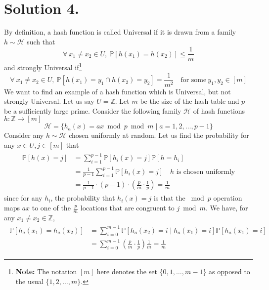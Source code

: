 \documentclass[9pt]{article}
\newcommand{\Probability}[1]{\mathbb{P}\left[ #1 \right]}
\begin{document}
\section*{\textbf{Solution 4.}}
By definition, a hash function is called Universal if it is drawn from a family $h \sim \mathcal{H}$
such that
\begin{equation}
    \forall \ x_{1} \neq x_{2} \in U, \ \Probability{h(x_{1}) = h(x_{2})} \leq \frac{1}{m}
\end{equation}
and strongly Universal if\footnote{
    \textbf{Note:} The notation $[m]$ here denotes the set $\{0, 1, \dots, m-1\}$
    as opposed to the usual $\{1, 2, \dots, m\}$.
}
\begin{equation}
    \forall \ x_{1} \neq x_{2} \in U, \ \Probability{h(x_{1}) = y_{1} \cap h(x_{2}) = y_{2}}
    = \frac{1}{m^{2}} \quad \text{for some} \ y_{1}, y_{2} \in [m]
\end{equation}
We want to find an example of a hash function which is Universal, but not strongly Universal.
Let us say $U = \mathbb{Z}$. Let $m$ be the size of the hash table and $p$ be a sufficiently
large prime. Consider the following family $\mathcal{H}$ of hash functions
$h: \mathbb{Z} \rightarrow [m]$
\begin{equation}
    \mathcal{H} = \{ h_{a}(x) = ax \bmod p \bmod m \mid a = 1, 2, \dots, p-1 \}
\end{equation}
Consider any $h \sim \mathcal{H}$ chosen uniformly at random. Let us find the probability
for any $x \in U, j \in [m]$ that
\begin{align}
    \begin{split}
        \Probability{h(x) = j} &= \sum_{i=1}^{p-1} \Probability{h_{i}(x) = j} \Probability{h = h_{i}} \\
        &= \frac{1}{p-1} \sum_{i=1}^{p-1} \Probability{h_{i}(x) = j} \quad h \text{ is chosen uniformly} \\
        &= \frac{1}{p-1} \cdot (p-1) \cdot \left( \frac{p}{m} \cdot \frac{1}{p} \right) = \frac{1}{m}
    \end{split}
\end{align}
since for any $h_{i}$, the probability that $h_{i}(x) = j$ is that the $\bmod p$ operation
maps $ax$ to one of the $\frac{p}{m}$ locations that are congruent to $j \bmod m$.
We have, for any $x_{1} \neq x_{2} \in \mathbb{Z}$,
\begin{align}
    \begin{split}
        \Probability{h_{a}(x_{1}) = h_{a}(x_{2})}
        &= \sum_{i=0}^{m-1} \Probability{h_{a}(x_{2}) = i \mid h_{a}(x_{1}) = i}
        \Probability{h_{a}(x_{1}) = i} \\
        &= \sum_{i=0}^{m-1} \left( \frac{p}{m} \cdot \frac{1}{p} \right) \frac{1}{m}
        = \frac{1}{m}
    \end{split}
\end{align}
\end{document}
